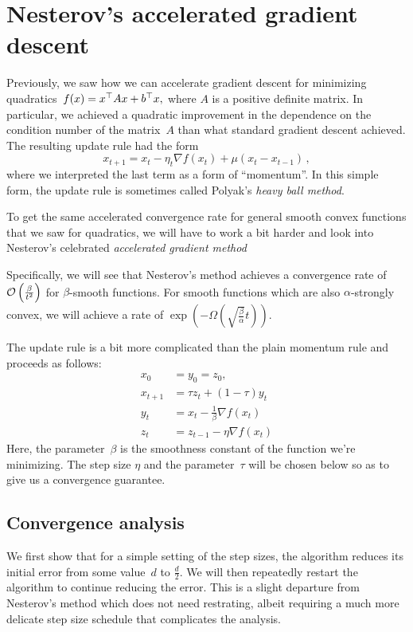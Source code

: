 \section{Nesterov’s accelerated gradient descent}

Previously, we saw how we can accelerate gradient descent for minimizing
quadratics~$f(x)=x^\top A x+b^\top x,$ where $A$ is a positive definite
matrix. In particular, we achieved a quadratic improvement in the dependence
on the condition number of the matrix~$A$ than what standard gradient descent
achieved. The resulting update rule had the form
\[
x_{t+1} = x_t -\eta_t\nabla f(x_t) + \mu(x_t-x_{t-1})\,,
\]
where we interpreted the last term as a form of ``momentum''. In this simple
form, the update rule is sometimes called Polyak's \emph{heavy ball method}.

To get the same accelerated convergence rate for general smooth convex functions
that we saw for quadratics, we will have to work a bit harder and look into
Nesterov's celebrated \emph{accelerated gradient method}~\cite{Nesterov83,
Nesterov04}

Specifically, we will see that Nesterov's method achieves a convergence rate
of~${\cal O} \left(\frac{\beta}{t^2}\right)$ for $\beta$-smooth functions. For smooth
functions which are also $\alpha$-strongly convex, we will achieve a rate of
$\exp\left( -\Omega\left(\sqrt{\frac{\beta}{\alpha}} t\right)\right)$. 

The update rule is a bit more complicated than the plain momentum rule 
and proceeds as follows:
\begin{align*}
x_0 &= y_0 = z_0, \\
x_{t+1} &= \tau z_t + (1 - \tau) y_t \tag{$t\ge 0$}\\
y_t &= x_t - \frac{1}{\beta} \nabla f(x_t) \tag{$t\ge 1$}\\
z_t &= z_{t-1} - \eta\nabla f(x_t)\tag{$t\ge 1$}
\end{align*}
Here, the parameter~$\beta$ is the smoothness constant of the function we're
minimizing. The step size $\eta$ and the parameter~$\tau$ will be chosen below
so as to give us a convergence guarantee.

\subsection{Convergence analysis}

We first show that for a simple setting of the step sizes, the algorithm reduces
its initial error from some value~$d$ to $\frac{d}{2}.$ We will then repeatedly
restart the algorithm to continue reducing the error. This is a slight departure
from Nesterov's method which does not need restrating, albeit requiring a much
more delicate step size schedule that complicates the analysis.

